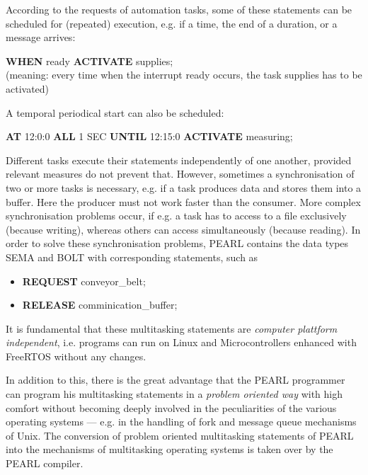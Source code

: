 According to the requests of automation tasks, some of these
statements can be scheduled for (repeated) execution, e.g. if a time,
the end of a duration, or a message arrives:

{\bf WHEN} ready {\bf ACTIVATE} supplies;\\
(meaning: every time when the interrupt ready occurs, the task supplies
has to be activated)

A temporal periodical start can also be scheduled:

{\bf AT} 12:0:0 {\bf ALL} 1 SEC {\bf UNTIL} 12:15:0 {\bf ACTIVATE} measuring;

Different tasks execute their statements independently of one another,
provided relevant measures do not prevent that. However, sometimes a
synchronisation of two or more tasks is necessary, e.g. if a task
produces data and stores them into a buffer. Here the producer must not
work faster than the consumer. More complex synchronisation problems
occur, if e.g. a task has to access to a file exclusively (because
writing), whereas others can access simultaneously (because reading). In
order to solve these synchronisation problems, PEARL contains the data
types SEMA and BOLT 
with corresponding statements, such as

\begin{itemize}
\item {\bf REQUEST} conveyor\_belt;        %
\item {\bf RELEASE} comminication\_buffer; %
\end{itemize}


It is fundamental that these multitasking statements are {\it computer 
plattform independent}, i.e. \OpenPEARL{} programs can run on Linux and 
Microcontrollers enhanced with FreeRTOS without any changes.

In addition to this, there is the great advantage that the PEARL
programmer can program his multitasking statements in a {\it problem
oriented way} with high comfort without becoming deeply involved in the
peculiarities of the various operating systems --- e.g. in the handling
of fork and message queue mechanisms of Unix. The conversion of problem
oriented multitasking statements of PEARL into the mechanisms of
multitasking operating systems is taken over by the PEARL compiler.

